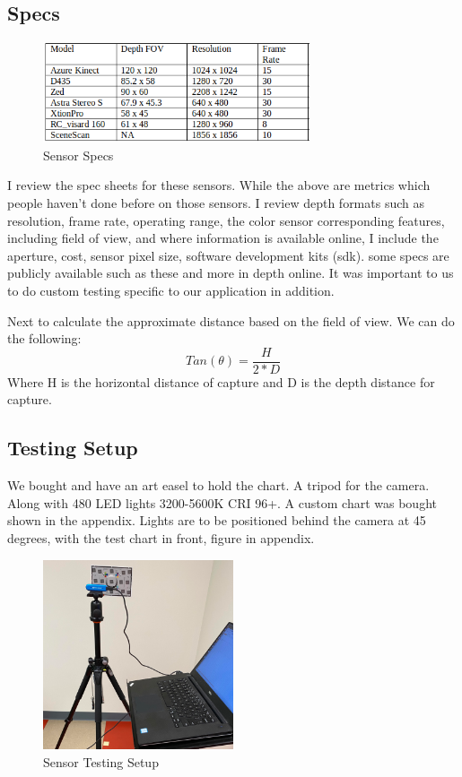 \subsection{Specs}
\begin{figure}[!htb]
	\caption{Sensor Specs}
	\centering
	\includegraphics[width=0.7\textwidth, angle=0]{images/sensor_specs.png}
\end{figure}
I review the spec sheets for these sensors. While the above are metrics which people haven't done before on those sensors. I review depth formats such as resolution, frame rate, operating range, the color sensor corresponding features, including field of view, and where information is available online, I include the aperture, cost, sensor pixel size, software development kits (sdk).
some specs are publicly available such as these and more in depth online. It was important to us to do custom testing specific to our application in addition.

Next to calculate the approximate distance based on the field of view. We can do the following:
\begin{equation}
	Tan(\theta) = \frac{H}{2 * D}
\end{equation}
Where H is the horizontal distance of capture and D is the depth distance for capture.
\subsection{Testing Setup}
We bought and have an art easel to hold the chart. A tripod for the camera. Along with 480 LED lights 3200-5600K CRI 96+. A custom chart was bought shown in the appendix. Lights are to be positioned behind the camera at 45 degrees, with the test chart in front, figure in appendix. 
\begin{figure}[!htb]
	\caption{Sensor Testing Setup}
	\centering
	\includegraphics[width=0.5\textwidth, angle=0]{images/sensor_testing.png}
\end{figure}

